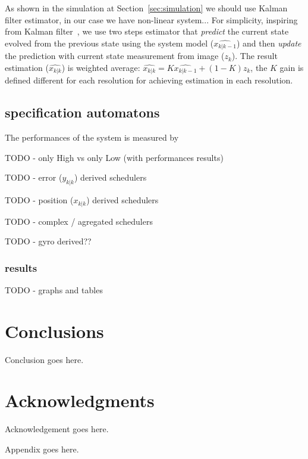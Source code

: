 \documentclass{sig-alternate-ipsn13}
\begin{document}
As shown in the simulation at Section~\ref{sec:simulation} we should use Kalman filter estimator, in our case we have non-linear system... %
For simplicity, inspiring from Kalman filter~\cite{??? kalman}, we use two steps estimator that \textit{predict} the current state evolved from the previous state using the system model ($\hat{x_{k|k-1}}$) and then \textit{update} the prediction with current state measurement from image ($z_k$).
The result estimation ($\hat{x_{k|k}}$) is weighted average: 
$ \hat{x_{k|k}} = K \hat{x_{k|k-1}} + (1-K) z_k $, 
the $K$ gain is defined different for each resolution for achieving estimation in each resolution.

\subsection{specification automatons}

The performances of the system is measured by 

TODO - only High vs only Low (with performances results)

TODO - error ($y_{k|k}$) derived schedulers

TODO - position ($x_{k|k}$) derived schedulers

TODO - complex / agregated schedulers

TODO - gyro derived??


\subsubsection{results}
TODO - graphs and tables


\section{Conclusions}
Conclusion goes here.


\section*{Acknowledgments}
Acknowledgement goes here.


%

%
%
\appendix

Appendix goes here.

\end{document}
